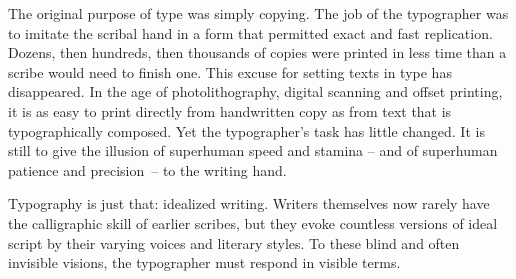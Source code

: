 The original purpose of type was simply copying. The job of the typographer was to imitate the scribal hand in a form that permitted exact and fast replication. Dozens, then hundreds, then thousands of copies were printed in less time than a scribe would need to finish one. This excuse for setting texts in type has disappeared. In the age of photolithography, digital scanning and offset printing, it is as easy to print directly from handwritten copy as from text that is typographically composed. Yet the typographer's task has little changed. It is still to give the illusion of superhuman speed and stamina -- and of superhuman patience and precision~-- to the writing hand.

Typography is just that: idealized writing. Writers themselves now rarely have the calligraphic skill of earlier scribes, but they evoke countless versions of ideal script by their varying voices and literary styles. To these blind and often invisible visions, the typographer must respond in visible terms.

